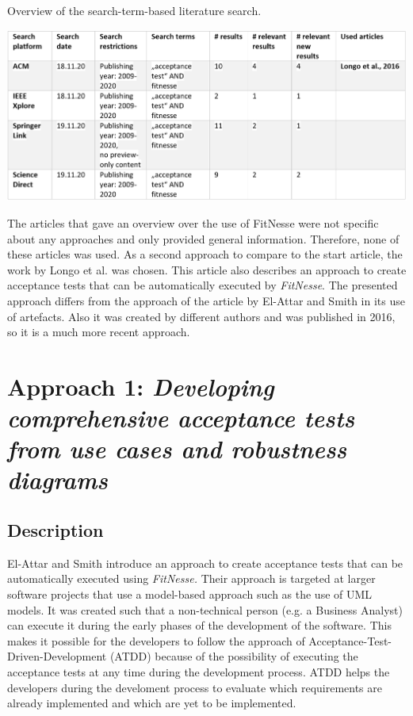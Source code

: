 \begin{table}[H]
	\caption{Overview of the search-term-based literature search.}
	\includegraphics[width=\textwidth]{../images/LitSearchFitnesse.png} 
	
	\label{fig:lit-search-fitnesse}
\end{table}


The articles that gave an overview over the use of FitNesse were not specific about any approaches and only provided general information.
Therefore, none of these articles was used.
As a second approach to compare to the start article, the work by Longo et al. \cite{longo} was chosen.
This article also describes an approach to create acceptance tests that can be automatically executed by \textit{FitNesse}.
The presented approach differs from the approach of the article by El-Attar and Smith in its use of artefacts.
Also it was created by different authors and was published in 2016, so it is a much more recent approach.


\section{Approach 1: \textit{Developing comprehensive acceptance tests from use cases and robustness diagrams}}
\label{sec:el-attar}

\subsection{Description}

El-Attar and Smith \cite{el-attar} introduce an approach to create acceptance tests that can be automatically executed using \textit{FitNesse.}
Their approach is targeted at larger software projects that use a model-based approach such as the use of UML models. 
It was created such that a non-technical person (e.g. a Business Analyst) can execute it during the early phases of the development of the software.
This makes it possible for the developers to follow the approach of Acceptance-Test-Driven-Development (ATDD) because of the possibility of executing the acceptance tests at any time during the development process.
ATDD helps the developers during the develoment process to evaluate which requirements are already implemented and  which are yet to be implemented.

